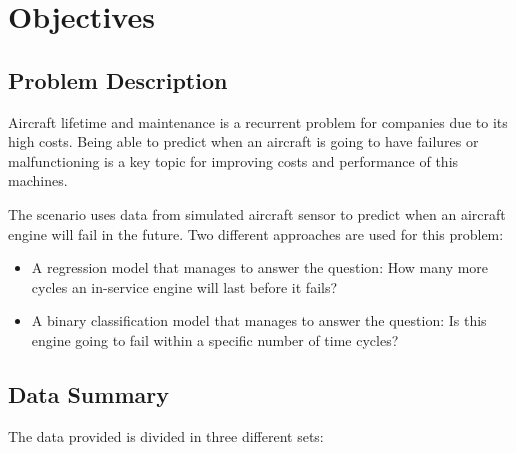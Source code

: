 
\chapter{Objectives} %

\label{Chapter1} %


\newcommand{\keyword}[1]{\textbf{#1}}
\newcommand{\tabhead}[1]{\textbf{#1}}
\newcommand{\code}[1]{\texttt{#1}}
\newcommand{\file}[1]{\texttt{\bfseries#1}}
\newcommand{\option}[1]{\texttt{\itshape#1}}


\section{Problem Description}
Aircraft lifetime and maintenance is a recurrent problem for companies due to its high costs.
Being able to predict when an aircraft is going to have failures or malfunctioning is a key topic for improving costs and performance of this machines.

The scenario uses data from simulated aircraft sensor to predict when an aircraft engine will fail in the future.
Two different approaches are used for this problem:

\begin{itemize}
\item A regression model that manages to answer the question: How many more cycles an in-service engine will last before it fails?
\item A binary classification model that manages to answer the question: Is this engine going to fail within a specific number of time cycles?
\end{itemize}


\section{Data Summary}\label{sec:data-summary}

The data provided is divided in three different sets:

